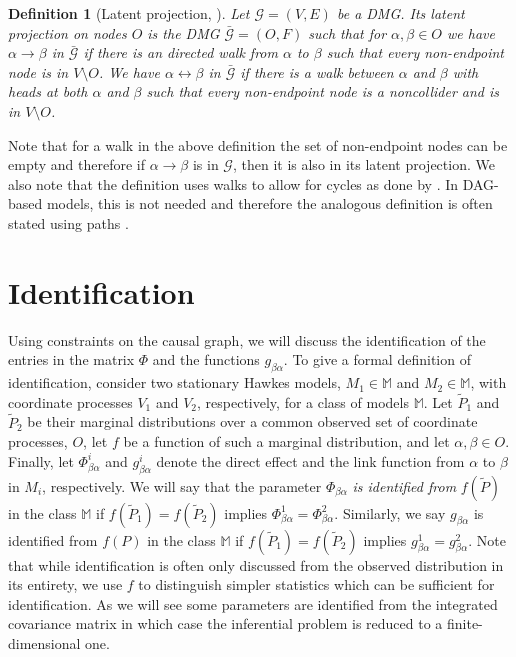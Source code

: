 \documentclass[accepted]{uai2021} %
\newtheorem{defn}[thm]{Definition}
\begin{document}
\begin{defn}[Latent projection, \cite{vermaEquiAndSynthesis,richardson2017}]
	\label{def:latProj}
	Let $\mathcal{G} = (V,E)$ be a DMG. Its latent projection on nodes $O$ is 
	the DMG $\bar{\mathcal{G}} = (O,F)$ such that for $\alpha,\beta\in O$ we 
	have $\alpha\rightarrow\beta$ in $\bar{\mathcal{G}}$ if there is an 
	directed walk from $\alpha$ to $\beta$ such that every non-endpoint node is 
	in $V\setminus O$. We have 
	$\alpha\leftrightarrow\beta$ in $\bar{\mathcal{G}}$ if there is a walk 
	between $\alpha$ and $\beta$ with heads at 
	both $\alpha$ and $\beta$ such that every non-endpoint node is a 
	noncollider and is in 
	$V\setminus O$.
\end{defn}

Note that for a walk in the above definition the set of non-endpoint nodes can 
be empty and therefore if $\alpha\rightarrow\beta$ is in $\mathcal{G}$, then it 
is 
also in its latent projection. We also note that the definition uses walks to 
allow for cycles as done by \cite{mogensen2018}. In DAG-based models, this is 
not needed 
and therefore the analogous definition is often stated using paths 
\citep{richardson2017}.


\section{Identification}

Using constraints on the causal graph, we will discuss the identification of 
the entries in the 
matrix $\Phi$ and the functions $g_{\beta\alpha}$. To give a formal definition 
of 
identification, consider two stationary Hawkes 
models, $M_1\in\mathbb{M}$ and $M_2\in\mathbb{M}$, with coordinate processes 
$V_1$ and $V_2$, 
respectively, for a class of models $\mathbb{M}$. Let $ \tilde{P}_1$ and $ 
\tilde{P}_2$ be their marginal 
distributions over a common observed set of 
coordinate processes, $O$, let $f$ be a function of 
such a marginal distribution, and let 
$\alpha,\beta\in O$. Finally, let $\Phi_{\beta\alpha}^i$ and 
$g_{\beta\alpha}^i$ 
denote the direct effect and the link function from $\alpha$ to 
$\beta$ in $M_i$, respectively. We will say that the parameter 
$\Phi_{\beta\alpha}$ \emph{is 
identified from} 
$f(\tilde{P})$ in the class $\mathbb{M}$ if $f(\tilde{P}_1) = f(\tilde{P}_2)$ 
implies $\Phi_{\beta\alpha}^1 = \Phi_{\beta\alpha}^2$. Similarly, we say 
$g_{\beta\alpha}$ is identified from $f(P)$ in the class $\mathbb{M}$ if 
$f(\tilde{P}_1) = 
f(\tilde{P}_2)$ 
implies $g_{\beta\alpha}^1 = g_{\beta\alpha}^2$. Note that while identification 
is often only discussed from the 
observed distribution in its entirety, we use $f$ to distinguish simpler 
statistics which can be sufficient for identification. As we will see some 
parameters are identified from the integrated covariance matrix in which case 
the inferential problem is reduced to a finite-dimensional one.
\end{document}

